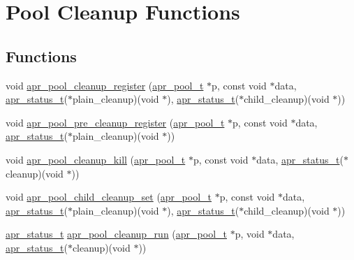 \hypertarget{group___pool_cleanup}{}\section{Pool Cleanup Functions}
\label{group___pool_cleanup}
\subsection*{Functions}
\begin{DoxyCompactItemize}
\item 
void \hyperlink{group___pool_cleanup_ga6bdb28224dfe08160cbe3ba6b22dcbd7}{apr\+\_\+pool\+\_\+cleanup\+\_\+register} (\hyperlink{group__apr__pools_gaf137f28edcf9a086cd6bc36c20d7cdfb}{apr\+\_\+pool\+\_\+t} $\ast$p, const void $\ast$data, \hyperlink{group__apr__errno_gaf76ee4543247e9fb3f3546203e590a6c}{apr\+\_\+status\+\_\+t}($\ast$plain\+\_\+cleanup)(void $\ast$), \hyperlink{group__apr__errno_gaf76ee4543247e9fb3f3546203e590a6c}{apr\+\_\+status\+\_\+t}($\ast$child\+\_\+cleanup)(void $\ast$))
\item 
void \hyperlink{group___pool_cleanup_ga64114542989d8872c7fd3c62f2a68678}{apr\+\_\+pool\+\_\+pre\+\_\+cleanup\+\_\+register} (\hyperlink{group__apr__pools_gaf137f28edcf9a086cd6bc36c20d7cdfb}{apr\+\_\+pool\+\_\+t} $\ast$p, const void $\ast$data, \hyperlink{group__apr__errno_gaf76ee4543247e9fb3f3546203e590a6c}{apr\+\_\+status\+\_\+t}($\ast$plain\+\_\+cleanup)(void $\ast$))
\item 
void \hyperlink{group___pool_cleanup_gadc59bf32a0302e34fa0a2663f6e48a44}{apr\+\_\+pool\+\_\+cleanup\+\_\+kill} (\hyperlink{group__apr__pools_gaf137f28edcf9a086cd6bc36c20d7cdfb}{apr\+\_\+pool\+\_\+t} $\ast$p, const void $\ast$data, \hyperlink{group__apr__errno_gaf76ee4543247e9fb3f3546203e590a6c}{apr\+\_\+status\+\_\+t}($\ast$cleanup)(void $\ast$))
\item 
void \hyperlink{group___pool_cleanup_ga7197fa6b43d9c5e99de17e0e900989ea}{apr\+\_\+pool\+\_\+child\+\_\+cleanup\+\_\+set} (\hyperlink{group__apr__pools_gaf137f28edcf9a086cd6bc36c20d7cdfb}{apr\+\_\+pool\+\_\+t} $\ast$p, const void $\ast$data, \hyperlink{group__apr__errno_gaf76ee4543247e9fb3f3546203e590a6c}{apr\+\_\+status\+\_\+t}($\ast$plain\+\_\+cleanup)(void $\ast$), \hyperlink{group__apr__errno_gaf76ee4543247e9fb3f3546203e590a6c}{apr\+\_\+status\+\_\+t}($\ast$child\+\_\+cleanup)(void $\ast$))
\item 
\hyperlink{group__apr__errno_gaf76ee4543247e9fb3f3546203e590a6c}{apr\+\_\+status\+\_\+t} \hyperlink{group___pool_cleanup_gabf3913823af6015895a726ab738eaac5}{apr\+\_\+pool\+\_\+cleanup\+\_\+run} (\hyperlink{group__apr__pools_gaf137f28edcf9a086cd6bc36c20d7cdfb}{apr\+\_\+pool\+\_\+t} $\ast$p, void $\ast$data, \hyperlink{group__apr__errno_gaf76ee4543247e9fb3f3546203e590a6c}{apr\+\_\+status\+\_\+t}($\ast$cleanup)(void $\ast$))

\end{DoxyCompactItemize}
